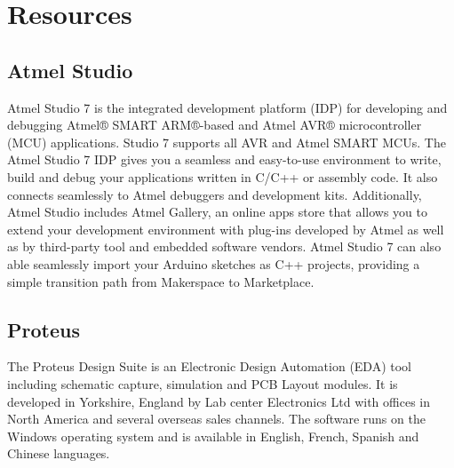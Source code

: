 \section{Resources}

\subsection{Atmel Studio}
Atmel Studio 7 is the integrated development platform (IDP) for developing and debugging Atmel® SMART ARM®-based and Atmel AVR® microcontroller (MCU) applications. Studio 7 supports all AVR and Atmel SMART MCUs. The Atmel Studio 7 IDP gives you a seamless and easy-to-use environment to write, build and debug your applications written in C/C++ or assembly code. It also connects seamlessly to Atmel debuggers and development kits.
Additionally, Atmel Studio includes Atmel Gallery, an online apps store that allows you to extend your development environment with plug-ins developed by Atmel as well as by third-party tool and embedded software vendors. Atmel Studio 7 can also able seamlessly import your Arduino sketches as C++ projects, providing a simple transition path from Makerspace to Marketplace.

\subsection{Proteus}
The Proteus Design Suite is an Electronic Design Automation (EDA) tool including schematic capture, simulation and PCB Layout modules. It is developed in Yorkshire, England by Lab center Electronics Ltd with offices in North America and several overseas sales channels. The software runs on the Windows operating system and is available in English, French, Spanish and Chinese languages.
